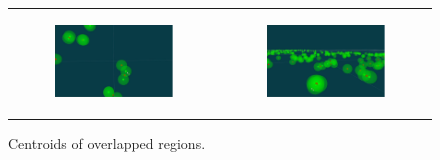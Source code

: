 \begin{figure}
    \centering
    \begin{tabular}{cc} 
        \begin{subfigure}{0.5\textwidth}
            \centering
            \includegraphics[width=\textwidth]{Images/Algorithm_no_obs/Centroid_1.png}
        \end{subfigure} 
        &
        \begin{subfigure}{0.5\textwidth}
            \centering
            \includegraphics[width=\textwidth]{Images/Algorithm_no_obs/Centroid_2.png}
        \end{subfigure}
    \end{tabular}
    \caption{Centroids of overlapped regions.\label{fig:overlape}} 
\end{figure}

\vspace{3mm}  


